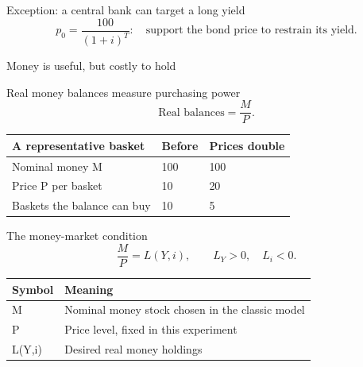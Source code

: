 \documentclass[12pt,aspectratio=169]{beamer}
\begin{document}

\begin{frame}{Exception: a central bank can target a long yield}
\[p_0=\frac{100}{(1+i)^T}:\quad\text{support the bond price to restrain its yield}.\]
\end{frame}


\begin{frame}{Money is useful, but costly to hold}
\end{frame}


\begin{frame}{Real money balances measure purchasing power}
\[\text{Real balances}=\frac{M}{P}.\]\begin{center}\begin{tabular}{@{}lll@{}}\toprule \textbf{A representative basket} & \textbf{Before} & \textbf{Prices double}\\\midrule Nominal money M & 100 & 100\\[2mm]
Price P per basket & 10 & 20\\[2mm]
Baskets the balance can buy & 10 & 5\\\bottomrule\end{tabular}\end{center}
\end{frame}


\begin{frame}{The money-market condition}
\[\boxed{\frac{M}{P}=L(Y,i),\qquad L_Y>0,\quad L_i<0.}\]\begin{center}\begin{tabular}{@{}ll@{}}\toprule \textbf{Symbol} & \textbf{Meaning}\\\midrule M & Nominal money stock chosen in the classic model\\[2mm]
P & Price level, fixed in this experiment\\[2mm]
L(Y,i) & Desired real money holdings\\\bottomrule\end{tabular}\end{center}
\end{frame}
\end{document}
